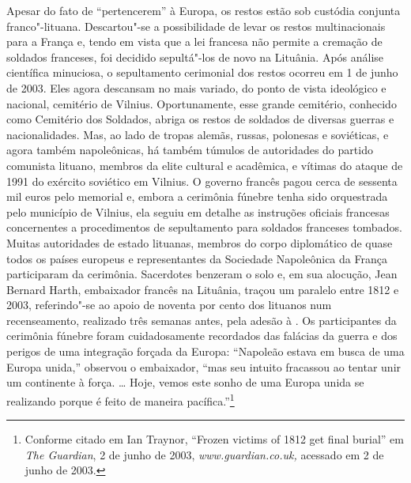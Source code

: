 Apesar do fato de ``pertencerem'' à Europa, os restos estão sob custódia
conjunta franco"-lituana. Descartou"-se a possibilidade de levar os restos
multinacionais para a França e, tendo em vista que a lei francesa não
permite a cremação de soldados franceses, foi decidido sepultá"-los de
novo na Lituânia. Após análise científica minuciosa, o sepultamento
cerimonial dos restos ocorreu em 1 de junho de 2003. Eles agora
descansam no mais variado, do ponto de vista ideológico e nacional,
cemitério de Vilnius. Oportunamente, esse grande cemitério, conhecido
como Cemitério dos Soldados, abriga os restos de soldados de diversas
guerras e nacionalidades. Mas, ao lado de tropas alemãs, russas,
polonesas e soviéticas, e agora também napoleônicas, há também túmulos
de autoridades do partido comunista lituano, membros da elite cultural e
acadêmica, e vítimas do ataque de 1991 do exército soviético em Vilnius.
O governo francês pagou cerca de sessenta mil euros pelo memorial e,
embora a cerimônia fúnebre tenha sido orquestrada pelo município de
Vilnius, ela seguiu em detalhe as instruções oficiais francesas
concernentes a procedimentos de sepultamento para soldados franceses
tombados. Muitas autoridades de estado lituanas, membros do corpo
diplomático de quase todos os países europeus e representantes da
Sociedade Napoleônica da França participaram da cerimônia. Sacerdotes
benzeram o solo e, em sua alocução, Jean Bernard Harth, embaixador
francês na Lituânia, traçou um paralelo entre 1812 e 2003, referindo"-se
ao apoio de noventa por cento dos lituanos num recenseamento, realizado
três semanas antes, pela adesão à . Os participantes da cerimônia
fúnebre foram cuidadosamente recordados das falácias da guerra e dos
perigos de uma integração forçada da Europa: ``Napoleão estava em busca
de uma Europa unida,'' observou o embaixador, ``mas seu intuito
fracassou ao tentar unir um continente à força. \ldots{} Hoje, vemos
este sonho de uma Europa unida se realizando porque é feito de maneira
pacífica.''\footnote{Conforme citado em Ian Traynor, ``Frozen victims of
  1812 get final burial'' em \emph{The Guardian}, 2 de junho de 2003,
  \emph{www.guardian.co.uk,} acessado em 2 de junho de 2003.}

